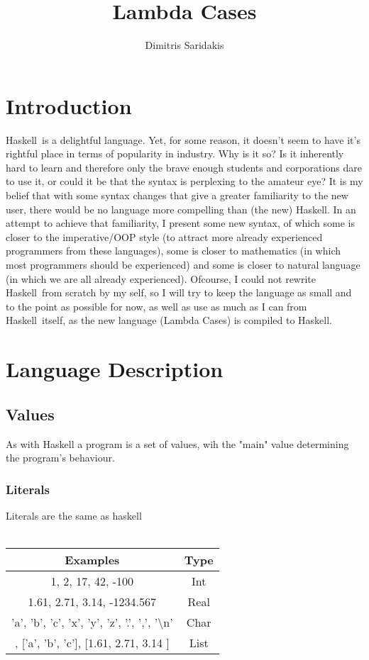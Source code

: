 \documentclass{article}
\date{}
\author{
  Dimitris Saridakis
}
\def\H{Haskell}
\begin{document}
\title{
\textbf{Lambda Cases}
}
\maketitle

\setcounter{tocdepth}{4}
\setcounter{secnumdepth}{4}
\tableofcontents

\section{Introduction}

\H\ is a delightful language. Yet, for some reason, it doesn't seem to have it's 
rightful place in terms of popularity in industry. Why is it so?
Is it inherently hard to learn
and therefore only the brave enough students and corporations dare to use it, or
could it be that the syntax is perplexing to the amateur eye? It is my belief that 
with some syntax changes that give a greater familiarity to the new user, there
would be no language more compelling than (the new) \H. In an attempt to achieve
that familiarity, I present some new syntax, of which
some is closer to the imperative/OOP style (to attract more already experienced
programmers from these languages), some is closer to mathematics (in which most 
programmers should be experienced) and some is closer to natural language
(in which we are all already experienced). Ofcourse, I could not rewrite \H\
from scratch by my self, so I will try to keep the language as small and to the 
point as possible for now, as well as use as much as I can from \H\ itself, as 
the new language (Lambda Cases) is compiled to \H.

\section{Language Description}

\subsection{Values}

As with Haskell a program is a set of values, wih the "main" value determining 
the program's behaviour.

\subsubsection{Literals}

Literals are the same as haskell \\ \\
\begin{tabular}{ |c|c| } 
\hline
Examples & Type \\ 
\hline
\hline
1, 2, 17, 42, -100 & Int \\ 
\hline
1.61, 2.71, 3.14, -1234.567 & Real \\ 
\hline
'a', 'b', 'c', 'x', 'y', 'z', '.', ',', '\textbackslash n' & Char \\
\hline
[1, 2, 3], ['a', 'b', 'c'], [1.61, 2.71, 3.14 ] & List \\
\hline
\end{tabular}
\end{document}
